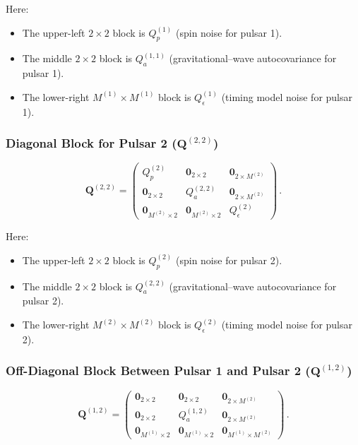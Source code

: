 \documentclass[]{scrartcl}
\begin{document}
	Here:
	\begin{itemize}
		\item The upper-left \(2\times2\) block is \(Q_p^{(1)}\) (spin noise for pulsar 1).
		\item The middle \(2\times2\) block is \(Q_a^{(1,1)}\) (gravitational–wave autocovariance for pulsar 1).
		\item The lower-right \(M^{(1)}\times M^{(1)}\) block is \(Q_\epsilon^{(1)}\) (timing model noise for pulsar 1).
	\end{itemize}
	
	\subsubsection*{Diagonal Block for Pulsar 2 (\(\boldsymbol{Q}^{(2,2)}\))}
	
	\begin{equation}
		\boldsymbol{Q}^{(2,2)} =
		\begin{pmatrix}
			Q_p^{(2)} & \boldsymbol{0}_{2\times2} & \boldsymbol{0}_{2\times M^{(2)}} \\[2mm]
			\boldsymbol{0}_{2\times2} & Q_a^{(2,2)} & \boldsymbol{0}_{2\times M^{(2)}} \\[2mm]
			\boldsymbol{0}_{M^{(2)}\times2} & \boldsymbol{0}_{M^{(2)}\times2} & Q_\epsilon^{(2)}
		\end{pmatrix}\,.
	\end{equation}
	
	Here:
	\begin{itemize}
		\item The upper-left \(2\times2\) block is \(Q_p^{(2)}\) (spin noise for pulsar 2).
		\item The middle \(2\times2\) block is \(Q_a^{(2,2)}\) (gravitational–wave autocovariance for pulsar 2).
		\item The lower-right \(M^{(2)}\times M^{(2)}\) block is \(Q_\epsilon^{(2)}\) (timing model noise for pulsar 2).
	\end{itemize}
	
	\subsubsection*{Off-Diagonal Block Between Pulsar 1 and Pulsar 2 (\(\boldsymbol{Q}^{(1,2)}\))}
	
	\begin{equation}
		\boldsymbol{Q}^{(1,2)} =
		\begin{pmatrix}
			\boldsymbol{0}_{2\times2} & \boldsymbol{0}_{2\times2} & \boldsymbol{0}_{2\times M^{(2)}} \\[2mm]
			\boldsymbol{0}_{2\times2} & Q_a^{(1,2)} & \boldsymbol{0}_{2\times M^{(2)}} \\[2mm]
			\boldsymbol{0}_{M^{(1)}\times2} & \boldsymbol{0}_{M^{(1)}\times2} & \boldsymbol{0}_{M^{(1)}\times M^{(2)}}
		\end{pmatrix}\,.
	\end{equation}
	
\end{document}
